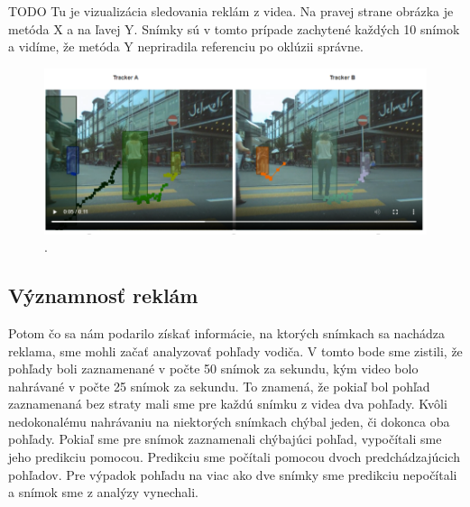 TODO Tu je vizualizácia sledovania reklám z videa. Na pravej strane obrázka je metóda X a na ľavej Y. Snímky sú v tomto prípade zachytené každých 10 snímok a vidíme, že metóda Y nepriradila referenciu po oklúzii správne.
\begin{figure}[ht]
    \centering
    \includegraphics[width=1\textwidth]{images/T/vs.png}
    \caption{.}
    \label{img:road}
\end{figure}

\subsection{Významnosť reklám}
Potom čo sa nám podarilo získať informácie, na ktorých snímkach sa nachádza reklama, sme mohli začať analyzovať pohľady vodiča. V tomto bode sme zistili, že pohľady boli zaznamenané v počte 50 snímok za sekundu, kým video bolo nahrávané v počte 25 snímok za sekundu. To znamená, že pokiaľ bol pohľad zaznamenaná bez straty mali sme pre každú snímku z videa dva pohľady. Kvôli nedokonalému nahrávaniu na niektorých snímkach chýbal jeden, či dokonca oba pohľady. Pokiaľ sme pre snímok zaznamenali chýbajúci pohľad, vypočítali sme jeho predikciu pomocou. Predikciu sme počítali pomocou dvoch predchádzajúcich pohľadov. Pre výpadok pohľadu na viac ako dve snímky sme predikciu nepočítali a snímok sme z analýzy vynechali.

